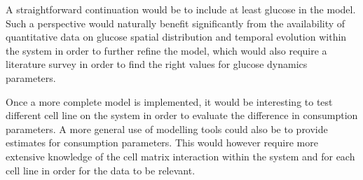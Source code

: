 \documentclass[11pt,a4paper]{article}
\begin{document}
A straightforward continuation would be to include at least glucose in the model. Such a perspective would naturally benefit significantly from the availability of quantitative data on glucose spatial distribution and temporal evolution within the system in order to further refine the model, which would also require a literature survey in order to find the right values for glucose dynamics parameters.

Once a more complete model is implemented, it would be interesting to test different cell line on the system in order to evaluate the difference in consumption parameters. A more general use of modelling tools could also be to provide estimates for consumption parameters. This would however require more extensive knowledge of the cell matrix interaction within the system and for each cell line in order for the data to be relevant.

\end{document}
